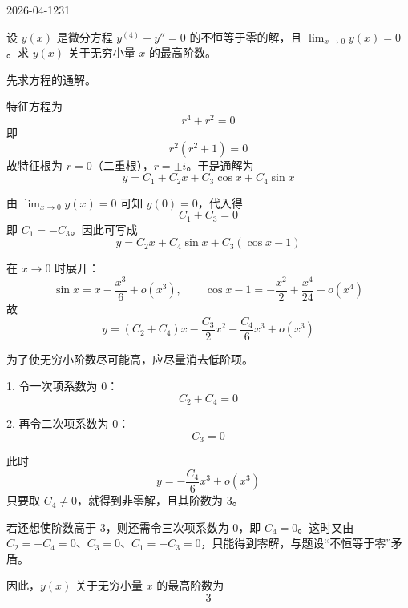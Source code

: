 \begin{mistake}{2026-04-12}{31}

\begin{problemcontent}
设 \( y(x) \) 是微分方程 \( y^{(4)}+y''=0 \) 的不恒等于零的解，且 \( \lim_{x\to 0}y(x)=0 \)。求 \( y(x) \) 关于无穷小量 \( x \) 的最高阶数。
\end{problemcontent}

\begin{solutioncontent}
先求方程的通解。

特征方程为
\[
r^4+r^2=0
\]
即
\[
r^2(r^2+1)=0
\]
故特征根为 \(r=0\)（二重根），\(r=\pm i\)。于是通解为
\[
y=C_1+C_2x+C_3\cos x+C_4\sin x
\]

由 \(\lim_{x\to 0}y(x)=0\) 可知 \(y(0)=0\)，代入得
\[
C_1+C_3=0
\]
即 \(C_1=-C_3\)。因此可写成
\[
y=C_2x+C_4\sin x+C_3(\cos x-1)
\]

在 \(x\to 0\) 时展开：
\[
\sin x=x-\frac{x^3}{6}+o(x^3),\qquad \cos x-1=-\frac{x^2}{2}+\frac{x^4}{24}+o(x^4)
\]
故
\[
y=(C_2+C_4)x-\frac{C_3}{2}x^2-\frac{C_4}{6}x^3+o(x^3)
\]

为了使无穷小阶数尽可能高，应尽量消去低阶项。

1. 令一次项系数为 0：
\[
C_2+C_4=0
\]

2. 再令二次项系数为 0：
\[
C_3=0
\]

此时
\[
y=-\frac{C_4}{6}x^3+o(x^3)
\]
只要取 \(C_4\neq 0\)，就得到非零解，且其阶数为 3。

若还想使阶数高于 3，则还需令三次项系数为 0，即 \(C_4=0\)。这时又由 \(C_2=-C_4=0\)、\(C_3=0\)、\(C_1=-C_3=0\)，只能得到零解，与题设“不恒等于零”矛盾。

因此，\(y(x)\) 关于无穷小量 \(x\) 的最高阶数为
\[
3
\]
\end{solutioncontent}


\end{mistake}
